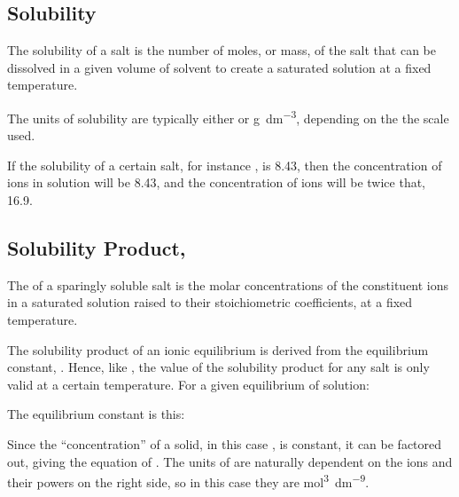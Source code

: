 		\subsection{Solubility}

			The solubility of a salt is the number of moles, or mass, of the salt that can be dissolved in a given volume of solvent to create
			a saturated solution at a fixed temperature.

			The units of solubility are typically either \si{\molarConc} or \si{\gram\per\cubic\deci\metre}, depending on the
			the scale used.

			If the solubility of a certain salt, for instance , is \SI{8.43}{\molarConc}, then the concentration of 
			ions in solution will be \SI{8.43}{\molarConc}, and the concentration of  ions will be twice that, \SI{16.9}{\molarConc}.



		\subsection{Solubility Product, \texorpdfstring{\Ksp{}}{Ksp}}

			The \Ksp{} of a sparingly soluble salt is the molar concentrations of the constituent ions in a saturated solution raised to their stoichiometric coefficients, at a fixed temperature.

			The solubility product of an ionic equilibrium is derived from the equilibrium constant, \Kc{}. Hence, like \Kc{}, the value of the solubility product for any salt is only valid at a certain temperature. For a given equilibrium of solution:


			The equilibrium constant is this:

			\mathdiagram{
				\[\MKc = \frac{[\ch{Mg+}][\ch{OH-}]^{2}}{[\ch{Mg(OH)2}]} \hspace{15mm} \MKsp = [\ch{Mg+}][\ch{OH-}]^{2}\]
			}

			Since the \enquote{concentration} of a solid, in this case , is constant, it can be factored out, giving the equation of \Ksp{}.
			The units of \Ksp{} are naturally dependent on the ions and their powers on the right side, so in this case they are
			\si{\mole\tothe{3}\per\deci\metre\tothe{9}}.

